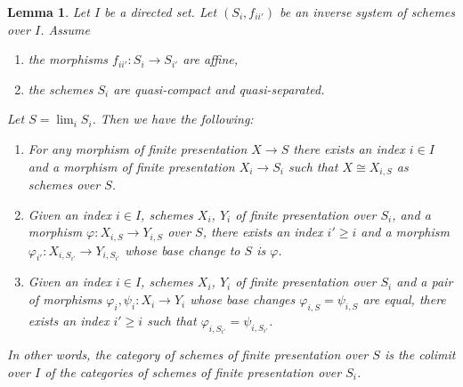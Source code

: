 \documentclass{amsart}
\theoremstyle{plain}
\newtheorem{lemma}[subsection]{Lemma}
\theoremstyle{definition}
\theoremstyle{remark}
\numberwithin{equation}{subsection}
\def\lim{\mathop{\mathrm{lim}}\nolimits}
\begin{document}
\begin{lemma}
\label{lemma-descend-finite-presentation}
Let $I$ be a directed set.
Let $(S_i, f_{ii'})$ be an inverse system of schemes over $I$.
Assume
\begin{enumerate}
\item the morphisms $f_{ii'} : S_i \to S_{i'}$ are affine,
\item the schemes $S_i$ are quasi-compact and quasi-separated.
\end{enumerate}
Let $S = \lim_i S_i$. Then we have the following:
\begin{enumerate}
\item For any morphism of finite presentation $X \to S$
there exists an index $i \in I$ and a morphism of finite
presentation $X_i \to S_i$ such that $X \cong X_{i, S}$ as
schemes over $S$.
\item Given an index $i \in I$, schemes
$X_i$, $Y_i$ of finite presentation over $S_i$, and a morphism
$\varphi : X_{i, S} \to Y_{i, S}$ over $S$, there exists an index
$i' \geq i$ and a morphism
$\varphi_{i'} : X_{i, S_{i'}} \to Y_{i, S_{i'}}$
whose base change to $S$ is $\varphi$.
\item Given an index $i \in I$, schemes $X_i$, $Y_i$ of finite presentation
over $S_i$ and a pair of morphisms $\varphi_i, \psi_i : X_i \to Y_i$
whose base changes $\varphi_{i, S} = \psi_{i, S}$ are equal,
there exists an index $i' \geq i$ such that
$\varphi_{i, S_{i'}} = \psi_{i, S_{i'}}$.
\end{enumerate}
In other words, the category of schemes of finite presentation over
$S$ is the colimit over $I$ of the categories of schemes of finite
presentation over $S_i$.
\end{lemma}
\end{document}
